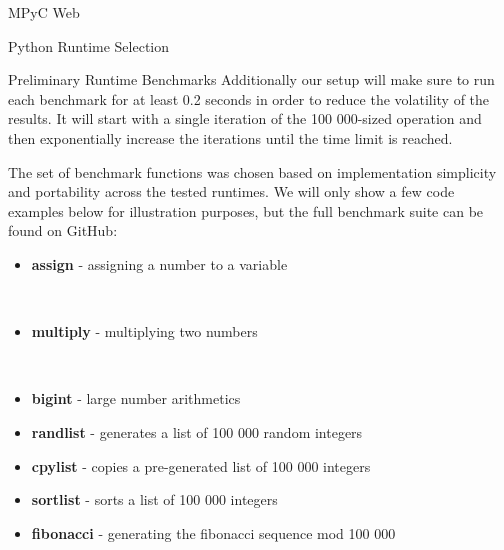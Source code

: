 \begin{block}{MPyC Web}
\begin{block}{Python Runtime Selection}
\begin{block}{Preliminary Runtime Benchmarks}
Additionally our setup will make sure to run each benchmark for at least 0.2 seconds in order to reduce the volatility of the results. It will start with a single iteration of the 100 000-sized operation and then exponentially increase the iterations until the time limit is reached.

The set of benchmark functions was chosen based on implementation simplicity and portability across the tested runtimes. We will only show a few code examples below for illustration purposes, but the full benchmark suite can be found on GitHub:

\begin{itemize}
\tightlist
\item
  \textbf{assign} - assigning a number to a variable
\end{itemize}

\begin{Shaded}
\begin{Highlighting}[]
\OperatorTok{=}\NormalTok{):}
    \NormalTok{ \_ }
\OperatorTok{=} 
\end{Highlighting}
\end{Shaded}

\begin{itemize}
\tightlist
\item
  \textbf{multiply} - multiplying two numbers
\end{itemize}

\begin{Shaded}
\begin{Highlighting}[]
\OperatorTok{=}\NormalTok{):}
    \NormalTok{ \_ }
         \OperatorTok{*} 
\end{Highlighting}
\end{Shaded}

\begin{itemize}
\tightlist
\item
  \textbf{bigint} - large number arithmetics
\item
  \textbf{randlist} - generates a list of 100 000 random integers
\item
  \textbf{cpylist} - copies a pre-generated list of 100 000 integers
\item
  \textbf{sortlist} - sorts a list of 100 000 integers
\item
  \textbf{fibonacci} - generating the fibonacci sequence mod 100 000
\end{itemize}


\end{block}
\end{block}
\end{block}
